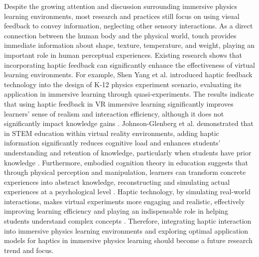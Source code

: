 \documentclass[sigconf,review,anonymous]{acmart}
\begin{document}
Despite the growing attention and discussion surrounding immersive physics learning environments, most research and practices still focus on using visual feedback to convey information, neglecting other sensory interactions. As a direct connection between the human body and the physical world, touch provides immediate information about shape, texture, temperature, and weight, playing an important role in human perceptual experiences\cite{zhang2023active}. Existing research shows that incorporating haptic feedback can significantly enhance the effectiveness of virtual learning environments. For example, Shen Yang et al. introduced haptic feedback technology into the design of K-12 physics experiment scenario, evaluating its application in immersive learning through quasi-experiments. The results indicate that using haptic feedback in VR immersive learning significantly improves learners' sense of realism and interaction efficiency, although it does not significantly impact knowledge gains \cite{shen2023research}. Johnson-Glenberg et al. demonstrated that in STEM education within virtual reality environments, adding haptic information significantly reduces cognitive load and enhances students' understanding and retention of knowledge, particularly when students have prior knowledge \cite{johnson2023embodied}. Furthermore, embodied cognition theory in education suggests that through physical perception and manipulation, learners can transform concrete experiences into abstract knowledge, reconstructing and simulating actual experiences at a psychological level \cite{varela2017embodied}. Haptic technology, by simulating real-world interactions, makes virtual experiments more engaging and realistic, effectively improving learning efficiency and playing an indispensable role in helping students understand complex concepts \cite{shapiro2019embodied}. Therefore, integrating haptic interaction into immersive physics learning environments and exploring optimal application models for haptics in immersive physics learning should become a future research trend and focus.
\end{document}
